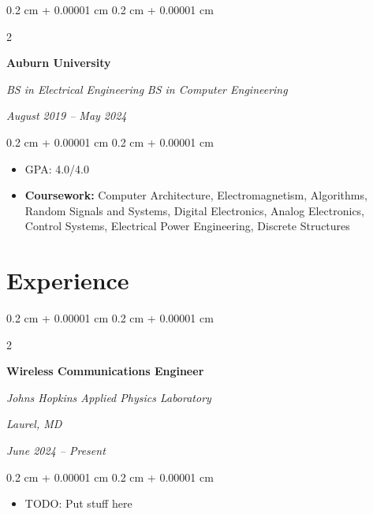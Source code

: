\documentclass[10pt, letterpaper]{article}
\newenvironment{highlights}{
    \begin{itemize}[
        topsep=0.10 cm,
        parsep=0.10 cm,
        partopsep=0pt,
        itemsep=0pt,
        leftmargin=0.4 cm + 10pt
    ]
}{
    \end{itemize}
} %
\newenvironment{onecolentry}{
    \begin{adjustwidth}{
        0.2 cm + 0.00001 cm
    }{
        0.2 cm + 0.00001 cm
    }
}{
    \end{adjustwidth}
} %
\newenvironment{twocolentry}[2][]{
    \onecolentry
    \def\secondColumn{#2}
    \setcolumnwidth{\fill, 4.5 cm}
    \begin{paracol}{2}
}{
    \switchcolumn \raggedleft \secondColumn
    \end{paracol}
    \endonecolentry
} %
\let\hrefWithoutArrow\href
\renewcommand{\href}[2]{\hrefWithoutArrow{#1}{\ifthenelse{\equal{#2}{}}{ }{#2 }\raisebox{.15ex}{\footnotesize \faExternalLink*}}}
\begin{document}
        \vspace{0.2 cm}

        \begin{twocolentry}{
        \textit{August 2019 – May 2024}}
            \textbf{Auburn University}

            \textit{BS in Electrical Engineering}
            \newline
            \textit{BS in Computer Engineering}
        \end{twocolentry}

        \vspace{0.10 cm}
        \begin{onecolentry}
            \begin{highlights}
                \item GPA: 4.0/4.0 %
                \item \textbf{Coursework:} Computer Architecture, Electromagnetism, Algorithms, Random Signals and Systems, Digital Electronics, Analog Electronics, Control Systems, Electrical Power Engineering, Discrete Structures
            \end{highlights}
        \end{onecolentry}








    \section{Experience}



        
        \begin{twocolentry}{
        \textit{Laurel, MD}    
            
        \textit{June 2024 – Present}}
            \textbf{Wireless Communications Engineer}
            
            \textit{Johns Hopkins Applied Physics Laboratory}
        \end{twocolentry}

        \vspace{0.10 cm}
        \begin{onecolentry}
            \begin{highlights}
                \item TODO: Put stuff here
            \end{highlights}
        \end{onecolentry}
\end{document}
